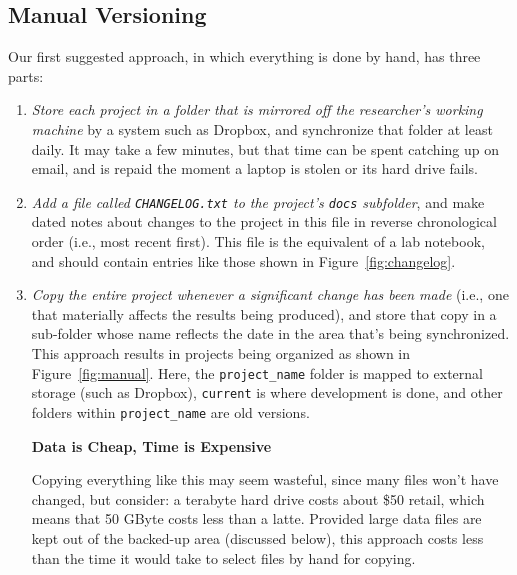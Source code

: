 \documentclass[10pt]{article}
\newcommand{\recommend}[1]{\textit{#1}}
\begin{document}
\subsection*{Manual Versioning}

Our first suggested approach, in which everything is done by hand, has
three parts:

\begin{enumerate}

\item
  \recommend{Store each project in a folder that is mirrored off the
    researcher's working machine} by a system such as Dropbox, and
  synchronize that folder at least daily. It may take a few minutes,
  but that time can be spent catching up on email, and is repaid the
  moment a laptop is stolen or its hard drive fails.

\item
  \recommend{Add a file called \texttt{CHANGELOG.txt} to the project's
    \texttt{docs} subfolder}, and make dated notes about changes to
  the project in this file in reverse chronological order (i.e., most
  recent first). This file is the equivalent of a lab notebook, and
  should contain entries like those shown in Figure~\ref{fig:changelog}.

\item
  \recommend{Copy the entire project whenever a significant change has
    been made} (i.e., one that materially affects the results being
  produced), and store that copy in a sub-folder whose name reflects
  the date in the area that's being synchronized. This approach
  results in projects being organized as shown in Figure~\ref{fig:manual}.
  Here, the \texttt{project\_name} folder is mapped to external storage
  (such as Dropbox), \texttt{current} is where development is done, and
  other folders within \texttt{project\_name} are old versions.

  \begin{framed}
    \noindent \textbf{Data is Cheap, Time is Expensive}

    Copying everything like this may seem wasteful, since many files won't
    have changed, but consider: a terabyte hard drive costs about \$50
    retail, which means that 50 GByte costs less than a latte. Provided
    large data files are kept out of the backed-up area (discussed below),
    this approach costs less than the time it would take to select files by
    hand for copying.
  \end{framed}

\end{enumerate}
\end{document}

